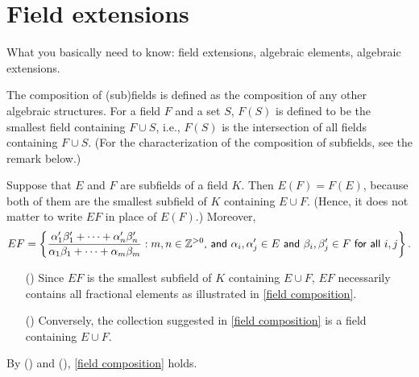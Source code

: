 \section{Field extensions}

What you basically need to know: field extensions, algebraic elements, algebraic extensions.

\begin{obs}\label{basic of field composition}
    The composition of (sub)fields is defined as the composition of any other algebraic structures.
    For a field $F$ and a set $S$, $F(S)$ is defined to be the smallest field containing $F\cup S$, i.e., $F(S)$ is the intersection of all fields containing $F\cup S$.
    (For the characterization of the composition of subfields, see the remark below.)
    
    Suppose that $E$ and $F$ are subfields of a field $K$.
    Then $E(F)=F(E)$, because both of them are the smallest subfield of $K$ containing $E\cup F$.
    (Hence, it does not matter to write $EF$ in place of $E(F)$.)
    Moreover,
    \begin{align}\label{field composition}
        EF
        =\left\{
            \frac{\alpha_1'\beta_1'+\cdots+\alpha_n'\beta_n'}{\alpha_1\beta_1+\cdots+\alpha_m\beta_m}
            :
            \textsf{$m, n\in{\mathbb{Z}}^{>0}$, and $\alpha_i, \alpha_j'\in E$ and $\beta_i, \beta_j'\in F$ for all $i, j$}\right\}.
    \end{align}
    \begin{enumerate}
        \item[(\romannumeral 1)]
        {
            Since $EF$ is the smallest subfield of $K$ containing $E\cup F$, $EF$ necessarily contains all fractional elements as illustrated in \cref{field composition}.
        }
        \item[(\romannumeral 2)]
        {
            Conversely, the collection suggested in \cref{field composition} is a field containing $E\cup F$.
        }
    \end{enumerate}
    By () and (), \cref{field composition} holds.


\end{obs}

